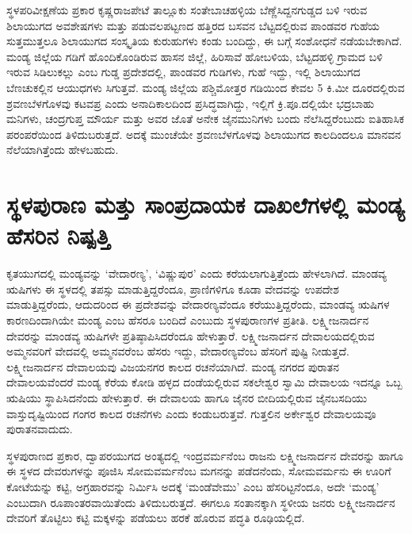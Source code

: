 ಸ್ಥಳಪರಿವೀಕ್ಷಣೆಯ ಪ್ರಕಾರ ಕೃಷ್ಣರಾಜಪೇಟೆ ತಾಲ್ಲೂಕು ಸಂತೇಬಾಚಹಳ್ಳಿಯ ಬೆಣ್ಣೆಸಿದ್ದನಗುಡ್ಡದ ಬಳಿ ಇರುವ \break ಶಿಲಾಯುಗದ ಅವಶೇಷಗಳು ಮತ್ತು ಪಡುವಲಪಟ್ಟಣದ ಹತ್ತಿರದ ಬಸವನ ಬೆಟ್ಟದಲ್ಲಿರುವ ಪಾಂಡವರ ಗುಹೆಯ ಸುತ್ತಮುತ್ತಲೂ ಶಿಲಾಯುಗದ ಸಂಸ್ಕೃತಿಯ ಕುರುಹುಗಳು ಕಂಡು ಬಂದಿದ್ದು, ಈ ಬಗ್ಗೆ ಸಂಶೋಧನೆ ನಡೆಯಬೇಕಾಗಿದೆ. ಮಂಡ್ಯ ಜಿಲ್ಲೆಯ ಗಡಿಗೆ ಹೊಂದಿಕೊಂಡಿರುವ ಹಾಸನ ಜಿಲ್ಲೆ, ಹಿರಿಸಾವೆ ಹೋಬಳಿಯ, ಬೆಟ್ಟದಹಳ್ಳಿ ಗ್ರಾಮದ ಬಳಿ ಇರುವ ಸಿಡಿಲುಕಲ್ಲು ಎಂಬ ಗುಡ್ಡ ಪ್ರದೇಶದಲ್ಲಿ, ಪಾಂಡವರ ಗುಡಿಗಳು, ಗುಹೆ ಇದ್ದು, ಇಲ್ಲಿ ಶಿಲಾಯುಗದ ಬೆಣಚುಕಲ್ಲಿನ ಆಯುಧಗಳು ಸಿಗುತ್ತವೆ. ಮಂಡ್ಯ ಜಿಲ್ಲೆಯ ಪಶ್ಚಿಮೋತ್ತರ ಗಡಿಯಿಂದ ಕೇವಲ 5 ಕಿ.ಮೀ ದೂರದಲ್ಲಿರುವ ಶ್ರವಣಬೆಳಗೊಳವು ಕಟವಪ್ರ ಎಂದು ಅನಾದಿಕಾಲದಿಂದ ಪ್ರಸಿದ್ಧವಾಗಿದ್ದು, ಇಲ್ಲಿಗೆ ಕ್ರಿ.ಪೂ.ದಲ್ಲಿಯೇ ಭದ್ರಬಾಹು ಮನಿಗಳು, ಚಂದ್ರಗುಪ್ತ ಮೌರ್ಯ ಮತ್ತು ಅವರ ಜೊತೆ ಅನೇಕ ಜೈನಮುನಿಗಳು ಬಂದು ನೆಲೆಸಿದ್ದರೆಂಬುದು ಐತಿಹಾಸಿಕ ಪರಂಪರೆಯಿಂದ ತಿಳಿದುಬರುತ್ತದೆ. ಅದಕ್ಕೆ ಮುಂಚೆಯೇ ಶ್ರವಣಬೆಳಗೊಳವು ಶಿಲಾಯುಗದ ಕಾಲದಿಂದಲೂ ಮಾನವನ ನೆಲೆಯಾಗಿತ್ತೆಂದು ಹೇಳಬಹುದು.


\section{ಸ್ಥಳಪುರಾಣ ಮತ್ತು ಸಾಂಪ್ರದಾಯಕ ದಾಖಲೆಗಳಲ್ಲಿ ಮಂಡ್ಯ ಹೆಸರಿನ ನಿಷ್ಪತ್ತಿ}

ಕೃತಯುಗದಲ್ಲಿ ಮಂಡ್ಯವನ್ನು ‘ವೇದಾರಣ್ಯ’, ‘ವಿಷ್ಣುಪುರ’ ಎಂದು ಕರೆಯಲಾಗುತ್ತಿತ್ತೆಂದು ಹೇಳಲಾಗಿದೆ. ಮಾಂಡವ್ಯ ಋಷಿಗಳು ಈ ಸ್ಥಳದಲ್ಲಿ ತಪಸ್ಸು ಮಾಡುತ್ತಿದ್ದರೆಂದೂ, ಪ್ರಾಣಿಗಳಿಗೂ ಕೂಡಾ ವೇದವನ್ನು ಉಪದೇಶ ಮಾಡುತ್ತಿದ್ದರೆಂದು, ಆದುದರಿಂದ ಈ ಪ್ರದೇಶವನ್ನು ವೇದಾರಣ್ಯವೆಂದೂ ಕರೆಯುತ್ತಿದ್ದರೆಂದು, ಮಾಂಡವ್ಯ ಋಷಿಗಳ ಕಾರಣದಿಂದಾಗಿಯೇ ಮಂಡ್ಯ ಎಂಬ ಹೆಸರೂ ಬಂದಿದೆ ಎಂಬುದು ಸ್ಥಳಪುರಾಣಗಳ ಪ್ರತೀತಿ. ಲಕ್ಷ್ಮೀಜನಾರ್ದನ ದೇವರನ್ನು ಮಾಂಡವ್ಯ ಋಷಿಗಳೇ ಪ್ರತಿಷ್ಠಾಪಿಸಿದರೆಂದೂ ಹೇಳುತ್ತಾರೆ. ಲಕ್ಷ್ಮೀಜನಾರ್ದನ ದೇವಾಲಯದಲ್ಲಿರುವ ಅಮ್ಮನವರಿಗೆ ವೇದವಲ್ಲಿ ಅಮ್ಮನವರೆಂಬ ಹೆಸರು ಇದ್ದು, ವೇದಾರಣ್ಯವೆಂಬ ಹೆಸರಿಗೆ ಪುಷ್ಟಿ ನೀಡುತ್ತದೆ. ಲಕ್ಷ್ಮೀಜನಾರ್ದನ ದೇವಾಲಯವು ವಿಜಯನಗರ ಕಾಲದ ರಚನೆಯಾಗಿದೆ. ಮಂಡ್ಯ ನಗರದ ಪುರಾತನ ದೇವಾಲಯವೆಂದರೆ ಮಂಡ್ಯ ಕೆರೆಯ ಕೋಡಿ ಹಳ್ಳದ ದಂಡೆಯಲ್ಲಿರುವ ಸಕಲೇಶ್ವರ ಸ್ವಾಮಿ ದೇವಾಲಯ ಇದನ್ನೂ ಒಬ್ಬ ಋಷಿಯು ಸ್ಥಾಪಿಸಿದನೆಂದು ಹೇಳುತ್ತಾರೆ. ಈ ದೇವಾಲಯ ಹಾಗೂ ಜೈನರ ಬೀದಿಯಲ್ಲಿರುವ ಜೈನಬಸದಿಯು ವಾಸ್ತುದೃಷ್ಟಿಯಿಂದ ಗಂಗರ ಕಾಲದ ರಚನೆಗಳು ಎಂದು ಕಂಡುಬರುತ್ತವೆ. ಗುತ್ತಲಿನ ಅರ್ಕೇಶ್ವರ ದೇವಾಲಯವೂ ಪುರಾತನವಾದುದು.

ಸ್ಥಳಪುರಾಣದ ಪ್ರಕಾರ, ದ್ವಾಪರಯುಗದ ಅಂತ್ಯದಲ್ಲಿ ಇಂದ್ರವರ್ಮನೆಂಬ ರಾಜನು ಲಕ್ಷ್ಮೀಜನಾರ್ದನ ದೇವರನ್ನು ಹಾಗೂ ಈ ಸ್ಥಳದ ದೇವರುಗಳನ್ನು ಪೂಜಿಸಿ ಸೋಮವರ್ಮನೆಂಬ ಮಗನನ್ನು ಪಡೆದನೆಂದು, ಸೋಮವರ್ಮನು ಈ ಊರಿಗೆ ಕೋಟೆಯನ್ನು ಕಟ್ಟಿ, ಅಗ್ರಹಾರವನ್ನು ನಿರ್ಮಿಸಿ ಅದಕ್ಕೆ ‘ಮಂಡೆವೇಮು’ ಎಂಬ ಹೆಸರಿಟ್ಟನೆಂದೂ, ಅದೇ ‘ಮಂಡ್ಯ’ ಎಂಬುದಾಗಿ ರೂಪಾಂತರವಾಯಿತೆಂದು ತಿಳಿದುಬರುತ್ತದೆ. ಈಗಲೂ ಸಂತಾನಕ್ಕಾಗಿ ಸ್ಥಳೀಯ ಜನರು ಲಕ್ಷ್ಮೀಜನಾರ್ದನ ದೇವರಿಗೆ ತೊಟ್ಟಿಲು ಕಟ್ಟಿ ಮಕ್ಕಳನ್ನು ಪಡೆಯಲು ಹರಕೆ ಹೊರುವ ಪದ್ಧತಿ ರೂಢಿಯಲ್ಲಿದೆ.

